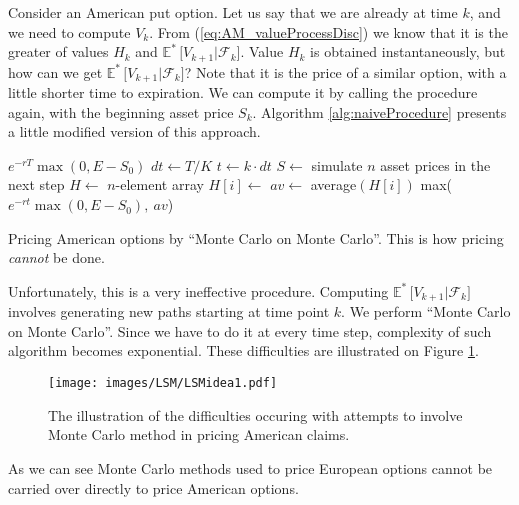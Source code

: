 \documentclass[a4paper,11pt, twoside]{book}
\theoremstyle{definition}
\theoremstyle{remark}
\def\Em{{\mathbb{E}^*}\,}
\begin{document}
Consider an American put option. Let us say that we are already at time $k$, and we need to compute $V_{k}$. From (\ref{eq:AM_valueProcessDisc}) we know that it is the greater of values $H_{k}$ and $\Em\bigl[ V_{k+1} | \mathcal{F}_{k} \bigr]$. Value $H_{k}$ is obtained instantaneously, but how can we get $\Em\bigl[ V_{k+1} | \mathcal{F}_{k} \bigr]$? Note that it is the price of a similar option, with a little shorter time to expiration. We can compute it by calling the procedure again, with the beginning asset price $S_{k}$. Algorithm \ref{alg:naiveProcedure} presents a little modified version of this approach.

\begin{algorithm}
 \begin{algorithmic}[1]
      \State \Return $e^{-rT} \max(0, E - S_0)$
    \EndIf
    \State $dt \gets T/K$
    \State $t \gets k\cdot dt$
    \State $S \gets$ simulate $n$ asset prices in the next step 
    \State $H \gets$ $n$-element array
       \State $H[i] \gets$ 
    \EndFor 
    \State $av \gets$ average$(H[i])$
    \State \Return max($e^{-rt} \max(0, E - S_0),\ av$)
  \EndFunction 
 \end{algorithmic}
 \caption{Pricing American options by ``Monte Carlo on Monte Carlo''. This is how pricing \emph{cannot} be done.}
 \label{alg:naiveProcedure}
\end{algorithm}

Unfortunately, this is a very ineffective procedure. Computing $\Em\bigl[ V_{k+1} | \mathcal{F}_{k} \bigr]$ involves generating new paths starting at time point $k$. We perform ``Monte Carlo on Monte Carlo''. Since we have to do it at every time step, complexity of such algorithm becomes exponential. These difficulties are illustrated on Figure \ref{fig:MC_difficulties}.

\begin{figure}[!ht]
\centering
 \texttt{[image: images/LSM/LSMidea1.pdf]}
\caption{The illustration of the difficulties occuring with attempts to involve Monte Carlo method in pricing American claims. }
\label{fig:MC_difficulties}
\end{figure}

As we can see Monte Carlo methods used to price European options cannot be carried over directly to price American options.
\end{document}
